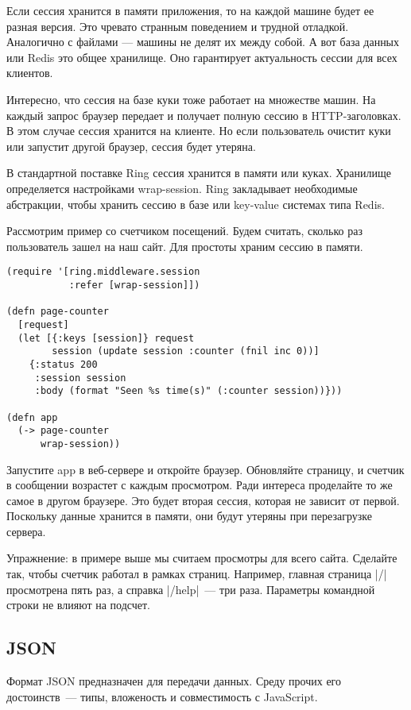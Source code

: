 Если сессия хранится в памяти приложения, то на каждой машине будет ее разная
версия. Это чревато странным поведением и трудной отладкой. Аналогично с файлами
— машины не делят их между собой. А вот база данных или Redis это общее
хранилище. Оно гарантирует актуальность сессии для всех клиентов.

Интересно, что сессия на базе куки тоже работает на множестве машин. На каждый
запрос браузер передает и получает полную сессию в HTTP-заголовках. В этом
случае сессия хранится на клиенте. Но если пользователь очистит куки или
запустит другой браузер, сессия будет утеряна.

В стандартной поставке Ring сессия хранится в памяти или куках. Хранилище
определяется настройками wrap-session. Ring закладывает необходимые абстракции,
чтобы хранить сессию в базе или key-value системах типа Redis.

Рассмотрим пример со счетчиком посещений. Будем считать, сколько раз
пользователь зашел на наш сайт. Для простоты храним сессию в памяти.

\begin{verbatim}
(require '[ring.middleware.session
           :refer [wrap-session]])

(defn page-counter
  [request]
  (let [{:keys [session]} request
        session (update session :counter (fnil inc 0))]
    {:status 200
     :session session
     :body (format "Seen %s time(s)" (:counter session))}))

(defn app
  (-> page-counter
      wrap-session))
\end{verbatim}

Запустите app в веб-сервере и откройте браузер. Обновляйте страницу, и счетчик в
сообщении возрастет с каждым просмотром. Ради интереса проделайте то же самое в
другом браузере. Это будет вторая сессия, которая не зависит от
первой. Поскольку данные хранится в памяти, они будут утеряны при перезагрузке
сервера.

Упражнение: в примере выше мы считаем просмотры для всего сайта. Сделайте так,
чтобы счетчик работал в рамках страниц. Например, главная страница \spverb|/|
просмотрена пять раз, а справка \spverb|/help|~--- три раза. Параметры командной строки
не влияют на подсчет.

\subsection{JSON}

Формат JSON предназначен для передачи данных. Среду прочих его достоинств~---
типы, вложеность и совместимость с JavaScript.

